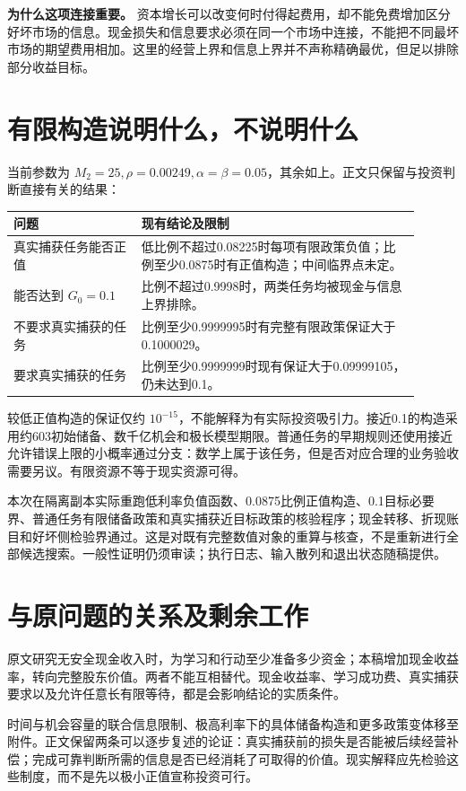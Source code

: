 \documentclass[UTF8,fontset=windows,11pt,a4paper]{ctexart}
\numberwithin{equation}{section}
\begin{document}
\noindent\textbf{为什么这项连接重要。}
资本增长可以改变何时付得起费用，却不能免费增加区分好坏市场的信息。现金损失和信息要求必须在同一个市场中连接，不能把不同最坏市场的期望费用相加。这里的经营上界和信息上界并不声称精确最优，但足以排除部分收益目标。

\section{有限构造说明什么，不说明什么}
当前参数为 $M_2=25,\rho=0.00249,\alpha=\beta=0.05$，其余如上。正文只保留与投资判断直接有关的结果：
\begin{center}
\begin{tabular}{p{0.29\linewidth}p{0.61\linewidth}}\toprule
问题 & 现有结论及限制\\\midrule
真实捕获任务能否正值 & 低比例不超过0.08225时每项有限政策负值；比例至少0.0875时有正值构造；中间临界点未定。\\
能否达到 $G_0=0.1$ & 比例不超过0.9998时，两类任务均被现金与信息上界排除。\\
不要求真实捕获的任务 & 比例至少0.9999995时有完整有限政策保证大于0.1000029。\\
要求真实捕获的任务 & 比例至少0.9999999时现有保证大于0.09999105，仍未达到0.1。\\\bottomrule
\end{tabular}
\end{center}

较低正值构造的保证仅约 $10^{-15}$，不能解释为有实际投资吸引力。接近0.1的构造采用约603初始储备、数千亿机会和极长模型期限。普通任务的早期规则还使用接近允许错误上限的小概率通过分支：数学上属于该任务，但是否对应合理的业务验收需要另议。有限资源不等于现实资源可得。

本次在隔离副本实际重跑低利率负值函数、0.0875比例正值构造、0.1目标必要界、普通任务有限储备政策和真实捕获近目标政策的核验程序；现金转移、折现账目和好坏侧检验界通过。这是对既有完整数值对象的重算与核查，不是重新进行全部候选搜索。一般性证明仍须审读；执行日志、输入散列和退出状态随稿提供。

\section{与原问题的关系及剩余工作}
原文研究无安全现金收入时，为学习和行动至少准备多少资金；本稿增加现金收益率，转向完整股东价值。两者不能互相替代。现金收益率、学习成功费、真实捕获要求以及允许任意长有限等待，都是会影响结论的实质条件。

时间与机会容量的联合信息限制、极高利率下的具体储备构造和更多政策变体移至附件。正文保留两条可以逐步复述的论证：真实捕获前的损失是否能被后续经营补偿；完成可靠判断所需的信息是否已经消耗了可取得的价值。现实解释应先检验这些制度，而不是先以极小正值宣称投资可行。
\end{document}
